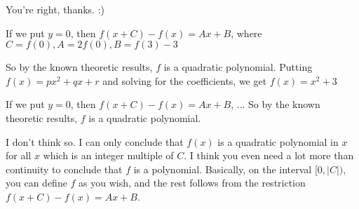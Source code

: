 


\begin{solution}
	You're right, thanks. :)
\end{solution}



\begin{solution}
	If we put $y=0$, then $f(x+C)-f(x)=Ax+B$, where $C=f(0), A=2f(0), B=f(3)-3$

So by the known theoretic results, $f$ is a quadratic polynomial. Putting $f(x)=px^2+qx+r$ and solving for the coefficients, we get $f(x)=x^2+3$
\end{solution}



\begin{solution}
	\begin{tcolorbox}If we put $y=0$, then $f(x+C)-f(x)=Ax+B$, ... So by the known theoretic results, $f$ is a quadratic polynomial.\end{tcolorbox}

I don't think so.  I can only conclude that $f(x)$ is a quadratic polynomial in $x$ for all $x$ which is an integer multiple of $C$.  I think you even need a lot more than continuity to conclude that $f$ is a polynomial.  Basically, on the interval $\big[0,|C|\big)$, you can define $f$ as you wish, and the rest follows from the restriction $f(x+C)-f(x)=Ax+B$.
\end{solution}




